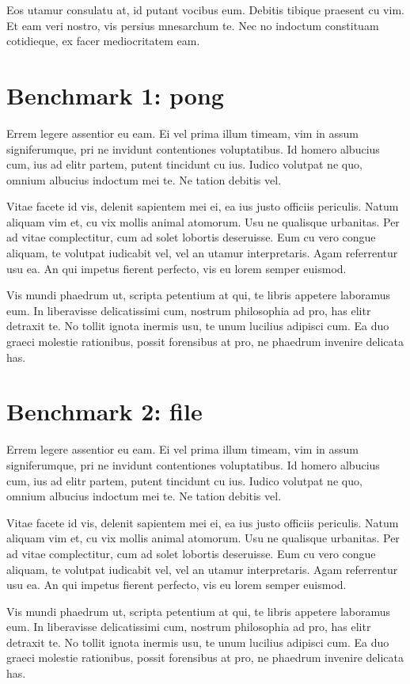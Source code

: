 \documentclass[a4paper,11pt,oneside]{report}
\begin{document}
Eos utamur consulatu at, id putant vocibus eum. Debitis tibique praesent cu
vim. Et eam veri nostro, vis persius mnesarchum te. Nec no indoctum constituam
cotidieque, ex facer mediocritatem eam.

\section{Benchmark 1: pong}

Errem legere assentior eu eam. Ei vel prima illum timeam, vim in assum
signiferumque, pri ne invidunt contentiones voluptatibus. Id homero albucius
cum, ius ad elitr partem, putent tincidunt cu ius. Iudico volutpat ne quo,
omnium albucius indoctum mei te. Ne tation debitis vel.

Vitae facete id vis, delenit sapientem mei ei, ea ius justo officiis
periculis. Natum aliquam vim et, cu vix mollis animal atomorum. Usu ne qualisque
urbanitas. Per ad vitae complectitur, cum ad solet lobortis deseruisse. Eum cu
vero congue aliquam, te volutpat iudicabit vel, vel an utamur
interpretaris. Agam referrentur usu ea. An qui impetus fierent perfecto, vis eu
lorem semper euismod.

Vis mundi phaedrum ut, scripta petentium at qui, te libris appetere laboramus
eum. In liberavisse delicatissimi cum, nostrum philosophia ad pro, has elitr
detraxit te. No tollit ignota inermis usu, te unum lucilius adipisci cum. Ea duo
graeci molestie rationibus, possit forensibus at pro, ne phaedrum invenire
delicata has.

\section{Benchmark 2: file}

Errem legere assentior eu eam. Ei vel prima illum timeam, vim in assum
signiferumque, pri ne invidunt contentiones voluptatibus. Id homero albucius
cum, ius ad elitr partem, putent tincidunt cu ius. Iudico volutpat ne quo,
omnium albucius indoctum mei te. Ne tation debitis vel.

Vitae facete id vis, delenit sapientem mei ei, ea ius justo officiis
periculis. Natum aliquam vim et, cu vix mollis animal atomorum. Usu ne qualisque
urbanitas. Per ad vitae complectitur, cum ad solet lobortis deseruisse. Eum cu
vero congue aliquam, te volutpat iudicabit vel, vel an utamur
interpretaris. Agam referrentur usu ea. An qui impetus fierent perfecto, vis eu
lorem semper euismod.

Vis mundi phaedrum ut, scripta petentium at qui, te libris appetere laboramus
eum. In liberavisse delicatissimi cum, nostrum philosophia ad pro, has elitr
detraxit te. No tollit ignota inermis usu, te unum lucilius adipisci cum. Ea duo
graeci molestie rationibus, possit forensibus at pro, ne phaedrum invenire
delicata has.
\end{document}
